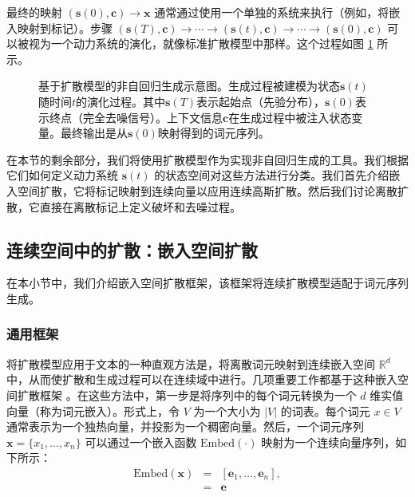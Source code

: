 \documentclass[UTF8,a4paper,zihao=-4,oneside,openany]{ctexbook}
\makeatletter
\newcommand{\AMLFigure}[2][0.96\linewidth]{%
  \begingroup
  \let\AtBeginDocument\@gobble
  \endgroup
}
\makeatother
\begin{document}
最终的映射 $(\mathbf{s}(0), \mathbf{c}) \to \mathbf{x}$ 通常通过使用一个单独的系统来执行（例如，将嵌入映射到标记）。步骤 $(\mathbf{s}(T), \mathbf{c}) \to \cdots \to (\mathbf{s}(t), \mathbf{c}) \to \cdots \to (\mathbf{s}(0), \mathbf{c})$ 可以被视为一个动力系统的演化，就像标准扩散模型中那样。这个过程如图 \ref{fig:diffiusion-modeling-as-nar-generation} 所示。

\begin{figure}[!t]
\centering
\AMLFigure{figure-diffiusion-modeling-as-nar-generation}
\caption{基于扩散模型的非自回归生成示意图。生成过程被建模为状态$\mathbf{s}(t)$随时间$t$的演化过程。其中$\mathbf{s}(T)$表示起始点（先验分布），$\mathbf{s}(0)$表示终点（完全去噪信号）。上下文信息$\mathbf{c}$在生成过程中被注入状态变量。最终输出是从$\mathbf{s}(0)$映射得到的词元序列。}
\label{fig:diffiusion-modeling-as-nar-generation}
\end{figure}

在本节的剩余部分，我们将使用扩散模型作为实现非自回归生成的工具。我们根据它们如何定义动力系统 $\mathbf{s}(t)$ 的状态空间对这些方法进行分类。我们首先介绍嵌入空间扩散，它将标记映射到连续向量以应用连续高斯扩散。然后我们讨论离散扩散，它直接在离散标记上定义破坏和去噪过程。
\subsection{连续空间中的扩散：嵌入空间扩散}

在本小节中，我们介绍嵌入空间扩散框架，该框架将连续扩散模型适配于词元序列生成。

\subsubsection{通用框架}

将扩散模型应用于文本的一种直观方法是，将离散词元映射到连续嵌入空间 $\mathbb{R}^d$ 中，从而使扩散和生成过程可以在连续域中进行。几项重要工作都基于这种嵌入空间扩散框架 \citep{li-etal:2022diffusion,strudel-etal:2022self,gong-etal:2023diffuseq}。在这些方法中，第一步是将序列中的每个词元转换为一个 $d$ 维实值向量（称为词元嵌入）。形式上，令 $V$ 为一个大小为 $|V|$ 的词表。每个词元 $x \in V$ 通常表示为一个独热向量，并投影为一个稠密向量。然后，一个词元序列 $\mathbf{x} = \{x_1, \dots, x_n\}$ 可以通过一个嵌入函数 $\mathrm{Embed}(\cdot)$ 映射为一个连续向量序列，如下所示：
\begin{eqnarray}
\mathrm{Embed}(\mathbf{x}) & = & [\mathbf{e}_1,\dots,\mathbf{e}_n], \nonumber \\
& = & \mathbf{e}
\end{eqnarray}
\end{document}
